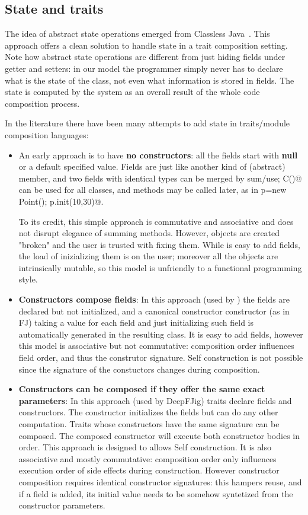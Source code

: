\subsection{State and traits}

The idea of abstract state operations emerged from Classless
Java~\cite{wang2016classless}. This approach offers a clean solution to handle state
in a trait composition setting.
Note how abstract state operations are different from just hiding fields under getter and setters: 
in our model the programmer simply never has to declare what is the state of the class, not even what information is stored in fields.
The state is computed by the system as an overall result of the whole code composition process.

In the literature there have been many attempts to add state in traits/module composition languages:
\begin{itemize}  
\item An early approach is to have {\bf no constructors}: all the fields start with {\bf null} or a default specified value.
  Fields are just like another kind of (abstract) member, and two fields
  with identical types can be merged by sum/use; \Q@new C()@ can be used for all classes, and \Q@init@ methods may be called later, as in
  \Q@Point p=new Point(); p.init(10,30)@.
  
  To its credit, this simple approach is commutative and associative and does not disrupt elegance of summing methods.
  However, objects are created "broken" and the user is trusted with fixing them.
  While is easy to add fields, the load of inizializing them is on the user; moreover
    all the objects are intrinsically mutable, so this model is unfriendly
    to a functional programming style.
\item {\bf Constructors compose fields}:
In this approach (used by \cite{fjig}) the fields are declared but not initialized, and
a canonical constructor constructor (as in FJ) taking a value for each field and just initializing such field
is automatically generated in the resulting class.
It is easy to add fields, however this model is associative but not commutative: composition order influences field order, and thus the construtor signature.
Self construction is not possible 
since the signature of the constuctors changes during composition.

\item {\bf Constructors can be composed if they offer the same exact parameters}:
In this approach (used by DeepFJig) traits declare fields and constructors.
The constructor initializes the fields but can do any other computation.
Traits whose constructors have the same signature can be composed.
The composed constructor will execute both constructor bodies in order.
This approach is designed to allows Self construction.
It is also associative and mostly commutative: composition order only influences execution order of side effects during construction.
However constructor composition requires identical constructor signatures: this
hampers reuse, and if a field is added, its initial value needs to be
somehow syntetized from the constructor parameters.

\end{itemize}

